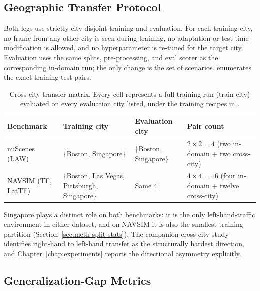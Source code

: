 \subsection{Geographic Transfer Protocol}
\label{sec:meth-phase1-protocol}

Both legs use strictly city-disjoint training and evaluation. For each training city, no frame from any other city is seen during training, no adaptation or test-time modification is allowed, and no hyperparameter is re-tuned for the target city. Evaluation uses the same splits, pre-processing, and eval scorer as the corresponding in-domain run; the only change is the set of scenarios.  enumerates the exact training-test pairs.

\begin{table}[ht]
\centering
\caption{Cross-city transfer matrix. Every cell represents a full training run (train city) evaluated on every evaluation city listed, under the training recipes in .}
\label{tab:meth-phase1-splits}
\small
\renewcommand{\arraystretch}{1.2}
\setlength{\tabcolsep}{5pt}
\begin{tabular}{@{}>{\raggedright\arraybackslash}p{2.7cm} >{\raggedright\arraybackslash}p{3.0cm} >{\raggedright\arraybackslash}p{3.1cm} >{\raggedright\arraybackslash}p{2.8cm}@{}}
\toprule
\textbf{Benchmark} & \textbf{Training city} & \textbf{Evaluation city} & \textbf{Pair count} \\
\midrule
nuScenes (LAW) & \{Boston, Singapore\} & \{Boston, Singapore\} & $2 \times 2 = 4$ (two in-domain + two cross-city) \\
\addlinespace
NAVSIM (TF, LatTF) & \{Boston, Las Vegas, Pittsburgh, Singapore\} & Same 4 & $4 \times 4 = 16$ (four in-domain + twelve cross-city) \\
\bottomrule
\end{tabular}
\end{table}

Singapore plays a distinct role on both benchmarks: it is the only left-hand-traffic environment in either dataset, and on NAVSIM it is also the smallest training partition (Section~\ref{sec:meth-split-stats}). The companion cross-city study~\cite{naeinian-cross-city-2026} identifies right-hand to left-hand transfer as the structurally hardest direction, and Chapter~\ref{chap:experiments} reports the directional asymmetry explicitly.

\subsection{Generalization-Gap Metrics}
\label{sec:meth-phase1-metrics}

